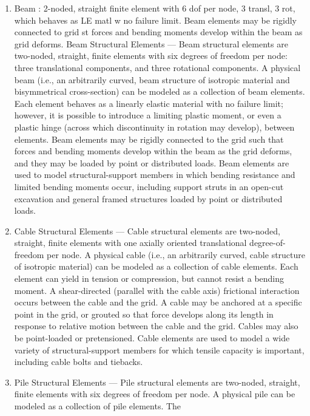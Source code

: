 \documentclass[a4paper, nobind]{templates/ociamthesis}
\providecommand{\tightlist}{%
  \setlength{\itemsep}{0pt}\setlength{\parskip}{0pt}}
\begin{document}
\begin{enumerate}
\def\labelenumi{\arabic{enumi}.}
\tightlist
\item
  Beam : 2-noded, straight finite element with 6 dof per node, 3
  transl, 3 rot, which behaves as LE matl w no failure limit. Beam
  elements may be rigidly connected to grid st forces and bending
  moments develop within the beam as grid deforms. Beam Structural
  Elements --- Beam structural elements are two-noded, straight,
  finite elements with six degrees of freedom per node: three
  translational components, and three rotational components. A
  physical beam (i.e., an arbitrarily curved, beam structure of
  isotropic material and bisymmetrical cross-section) can be modeled
  as a collection of beam elements. Each element behaves as a linearly
  elastic material with no failure limit; however, it is possible to
  introduce a limiting plastic moment, or even a plastic hinge (across
  which discontinuity in rotation may develop), between elements. Beam
  elements may be rigidly connected to the grid such that forces and
  bending moments develop within the beam as the grid deforms, and
  they may be loaded by point or distributed loads. Beam elements are
  used to model structural-support members in which bending resistance
  and limited bending moments occur, including support struts in an
  open-cut excavation and general framed structures loaded by point or
  distributed loads.
\item
  Cable Structural Elements --- Cable structural elements are
  two-noded, straight, finite elements with one axially oriented
  translational degree-of-freedom per node. A physical cable (i.e., an
  arbitrarily curved, cable structure of isotropic material) can be
  modeled as a collection of cable elements. Each element can yield in
  tension or compression, but cannot resist a bending moment. A
  shear-directed (parallel with the cable axis) frictional interaction
  occurs between the cable and the grid. A cable may be anchored at a
  specific point in the grid, or grouted so that force develops along
  its length in response to relative motion between the cable and the
  grid. Cables may also be point-loaded or pretensioned. Cable
  elements are used to model a wide variety of structural-support
  members for which tensile capacity is important, including cable
  bolts and tiebacks.
\item
  Pile Structural Elements --- Pile structural elements are two-noded,
  straight, finite elements with six degrees of freedom per node. A
  physical pile can be modeled as a collection of pile elements. The

\end{enumerate}
\end{document}

